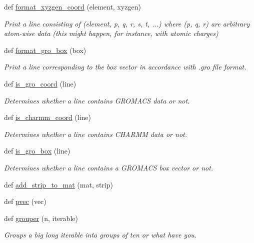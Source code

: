 \begin{DoxyCompactItemize}
def \hyperlink{namespacesrc_1_1molecule_aa91151bec25f2f39ce30c2a71bb7478f}{format\+\_\+xyzgen\+\_\+coord} (element, xyzgen)
\begin{DoxyCompactList}\small\item\em Print a line consisting of (element, p, q, r, s, t, ...) where (p, q, r) are arbitrary atom-\/wise data (this might happen, for instance, with atomic charges) \end{DoxyCompactList}\item 
def \hyperlink{namespacesrc_1_1molecule_a373f82faf5d8f3ce84095ed74ab77425}{format\+\_\+gro\+\_\+box} (box)
\begin{DoxyCompactList}\small\item\em Print a line corresponding to the box vector in accordance with .gro file format. \end{DoxyCompactList}\item 
def \hyperlink{namespacesrc_1_1molecule_a2cf7fe49895eedd6c60b7394f1435529}{is\+\_\+gro\+\_\+coord} (line)
\begin{DoxyCompactList}\small\item\em Determines whether a line contains G\+R\+O\+M\+A\+CS data or not. \end{DoxyCompactList}\item 
def \hyperlink{namespacesrc_1_1molecule_a17d81a43f4f28d4db24d6548dc7018dd}{is\+\_\+charmm\+\_\+coord} (line)
\begin{DoxyCompactList}\small\item\em Determines whether a line contains C\+H\+A\+R\+MM data or not. \end{DoxyCompactList}\item 
def \hyperlink{namespacesrc_1_1molecule_a0f007f8498ecc025f1e066d47fabfd24}{is\+\_\+gro\+\_\+box} (line)
\begin{DoxyCompactList}\small\item\em Determines whether a line contains a G\+R\+O\+M\+A\+CS box vector or not. \end{DoxyCompactList}\item 
def \hyperlink{namespacesrc_1_1molecule_a157c193873713c7029b653c1ca51eb7a}{add\+\_\+strip\+\_\+to\+\_\+mat} (mat, strip)
\item 
def \hyperlink{namespacesrc_1_1molecule_a5faf08001b21d2b7dae569cb9aecba15}{pvec} (vec)
\item 
def \hyperlink{namespacesrc_1_1molecule_a3d07eb6fe9de1d679c82213a4d7e988d}{grouper} (n, iterable)
\begin{DoxyCompactList}\small\item\em Groups a big long iterable into groups of ten or what have you. \end{DoxyCompactList}\item 

\end{DoxyCompactItemize}
